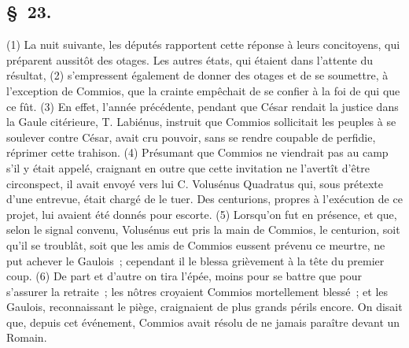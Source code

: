 \documentclass[french,twoside]{book} %
\begin{document}
\subsection[{§ 23.}]{ \textsc{§ 23.} }
\noindent (1) La nuit suivante, les députés rapportent cette réponse à leurs concitoyens, qui préparent aussitôt des otages. Les autres états, qui étaient dans l’attente du résultat, (2) s’empressent également de donner des otages et de se soumettre, à l’exception de Commios, que la crainte empêchait de se confier à la foi de qui que ce fût. (3) En effet, l’année précédente, pendant que César rendait la justice dans la Gaule citérieure, T. Labiénus, instruit que Commios sollicitait les peuples à se soulever contre César, avait cru pouvoir, sans se rendre coupable de perfidie, réprimer cette trahison. (4) Présumant que Commios ne viendrait pas au camp s’il y était appelé, craignant en outre que cette invitation ne l’avertît d’être circonspect, il avait envoyé vers lui C. Volusénus Quadratus qui, sous prétexte d’une entrevue, était chargé de le tuer. Des centurions, propres à l’exécution de ce projet, lui avaient été donnés pour escorte. (5) Lorsqu’on fut en présence, et que, selon le signal convenu, Volusénus eut pris la main de Commios, le centurion, soit qu’il se troublât, soit que les amis de Commios eussent prévenu ce meurtre, ne put achever le Gaulois ; cependant il le blessa grièvement à la tête du premier coup. (6) De part et d’autre on tira l’épée, moins pour se battre que pour s’assurer la retraite ; les nôtres croyaient Commios mortellement blessé ; et les Gaulois, reconnaissant le piège, craignaient de plus grands périls encore. On disait que, depuis cet événement, Commios avait résolu de ne jamais paraître devant un Romain.
\end{document}
